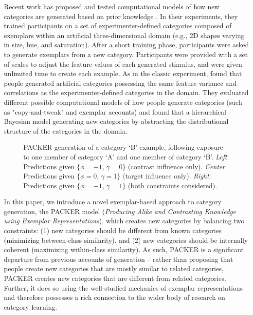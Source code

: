 \documentclass[10pt,letterpaper]{article}
\newcommand\inputpgf[2]{{
\let\pgfimageWithoutPath\pgfimage
\renewcommand{\pgfimage}[2][]{\pgfimageWithoutPath[##1]{#1/##2}}

}}
\begin{document}
Recent work has proposed and tested computational models of how new categories are generated based on prior knowledge \citep{jern2013probabilistic}. In their experiments, they trained participants on a set of experimenter-defined categories composed of exemplars within an artificial three-dimensional domain (e.g., 2D shapes varying in size, hue, and saturation). After a short training phase, participants were asked to generate exemplars from a new category. Participants were provided with a set of scales to adjust the feature values of each generated stimulus, and were given unlimited time to create each example. As in the classic \cite{ward1994structured} experiment, \citet{jern2013probabilistic} found that people generated artificial categories possessing the same feature variance and correlations as the experimenter-defined categories in the domain. They evaluated different possible computational models of how people generate categories (such as "copy-and-tweak" and exemplar accounts) and found that a hierarchical Bayesian model generating new categories by abstracting the distributional structure of the categories in the domain.

\begin{figure*}
    \begin{center}
    \inputpgf{figs/}{example-prob-spaces.pgf}
    \caption{PACKER generation of a category `B' example, following exposure to one member of category `A' and one member of category `B'. \textit{Left}: Predictions given $\{\phi = -1$, $\gamma = 0\}$ (contrast influence only). \textit{Center}: Predictions given $\{\phi = 0$, $\gamma = 1\}$ (target influence only).  \textit{Right}: Predictions given $\{\phi = -1$, $\gamma = 1\}$ (both constraints considered).  }
    \label{fig:example-prob-spaces}
    \end{center}
\end{figure*}

In this paper, we introduce a novel exemplar-based approach to category generation, the PACKER model (\textit{Producing Alike and Contrasting Knowledge using Exemplar Representations}), which creates new categories by balancing two constraints: (1) new categories should be different from known categories (minimizing between-class similarity), and (2) new categories should be internally coherent (maximizing within-class similarity). As such, PACKER is a significant departure from previous accounts of generation -- rather than proposing that people create new categories that are mostly similar to related categories, PACKER creates new categories that are different from related categories. Further, it does so using the well-studied mechanics of exemplar representations and therefore possesses a rich connection to the wider body of research on category learning.
\end{document}
